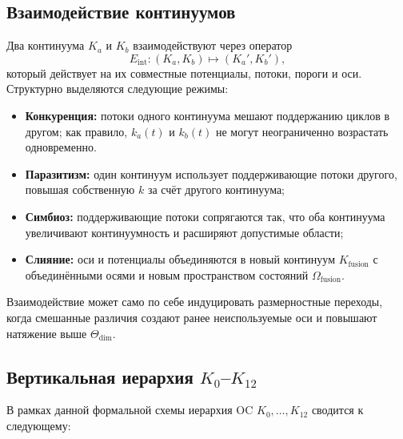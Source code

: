 \subsection{Взаимодействие континуумов}

Два континуума \(K_a\) и \(K_b\) взаимодействуют через оператор
\[
    E_{\mathrm{int}} : (K_a,K_b) \mapsto (K_a',K_b'),
\]
который действует на их совместные потенциалы, потоки, пороги и оси.
Структурно выделяются следующие режимы:

\begin{itemize}
    \item \textbf{Конкуренция:} потоки одного континуума мешают поддержанию циклов в другом;
          как правило, \(k_a(t)\) и \(k_b(t)\) не могут неограниченно возрастать одновременно.
    \item \textbf{Паразитизм:} один континуум использует поддерживающие потоки другого,
          повышая собственную \(k\) за счёт другого континуума;
    \item \textbf{Симбиоз:} поддерживающие потоки сопрягаются так, что оба континуума
          увеличивают континуумность и расширяют допустимые области;
    \item \textbf{Слияние:} оси и потенциалы объединяются в новый континуум
          \(K_{\mathrm{fusion}}\) с объединёнными осями и новым пространством состояний
          \(\Omega_{\mathrm{fusion}}\).
\end{itemize}

Взаимодействие может само по себе индуцировать размерностные переходы,
когда смешанные различия создают ранее неиспользуемые оси и повышают натяжение выше
\(\Theta_{\mathrm{dim}}\).

\subsection{Вертикальная иерархия \texorpdfstring{$K_0$--$K_{12}$}{K0--K12}}

В рамках данной формальной схемы иерархия OC \(K_0,\dots,K_{12}\) сводится к следующему:

